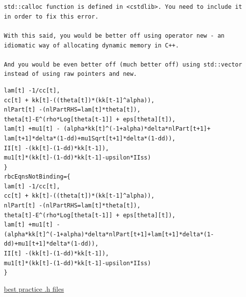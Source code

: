 \documentclass[hyperref]{labbook}
\begin{document}
\begin{verbatim}


std::calloc function is defined in <cstdlib>. You need to include it in order to fix this error.

With this said, you would be better off using operator new - an idiomatic way of allocating dynamic memory in C++.

And you would be even better off (much better off) using std::vector instead of using raw pointers and new.

\end{verbatim}
\begin{verbatim}
lam[t] -1/cc[t],
cc[t] + kk[t]-((theta[t])*(kk[t-1]^alpha)),
nlPart[t] -(nlPartRHS=lam[t]*theta[t]),
theta[t]-E^(rho*Log[theta[t-1]] + eps[theta][t]),
lam[t] +mu1[t] - (alpha*kk[t]^(-1+alpha)*delta*nlPart[t+1]+
lam[t+1]*delta*(1-dd)+mu1Sqrt[t+1]*delta*(1-dd)),
II[t] -(kk[t]-(1-dd)*kk[t-1]),
mu1[t]*(kk[t]-(1-dd)*kk[t-1]-upsilon*IIss)
}
rbcEqnsNotBinding={
lam[t] -1/cc[t],
cc[t] + kk[t]-((theta[t])*(kk[t-1]^alpha)),
nlPart[t] -(nlPartRHS=lam[t]*theta[t]),
theta[t]-E^(rho*Log[theta[t-1]] + eps[theta][t]),
lam[t] +mu1[t] - (alpha*kk[t]^(-1+alpha)*delta*nlPart[t+1]+lam[t+1]*delta*(1-dd)+mu1[t+1]*delta*(1-dd)),
II[t] -(kk[t]-(1-dd)*kk[t-1]),
mu1[t]*(kk[t]-(1-dd)*kk[t-1]-upsilon*IIss)
}
\end{verbatim}





\href{http://www.acodersjourney.com/2016/05/top-10-c-header-file-mistakes-and-how-to-fix-them/}{best practice .h files}


\end{document}
